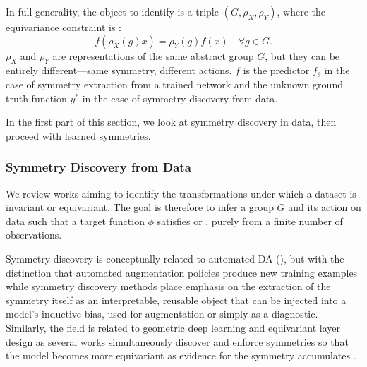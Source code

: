 \documentclass[mathematics,review,submit,moreauthors]{Definitions/mdpi}
\begin{document}
In full generality, the object to identify is a triple $(G, \rho_X, \rho_Y)$, where the equivariance constraint is :
\begin{equation}
    f(\rho_X(g) x) = \rho_Y(g) f(x) \quad \forall g \in G.
\end{equation}
$\rho_X$ and $\rho_Y$ are representations of the same abstract group $G$, but they can be entirely different---same symmetry, different actions.
$f$ is the predictor $f_\theta$ in the case of symmetry extraction from a trained network and the unknown ground truth function $y^*$ in the case of symmetry discovery from data.

In the first part of this section, we look at symmetry discovery in data, then proceed with learned symmetries.


\subsubsection{Symmetry Discovery from Data}\label{sec:sym-disc-from-data}


We review works aiming to identify the transformations under which a dataset is invariant or equivariant.
The goal is therefore to infer a group $G$ and its action on data such that a target function $\phi$ satisfies  or , purely from a finite number of observations.

Symmetry discovery is conceptually related to automated DA (), but with the distinction that automated augmentation policies produce new training examples while symmetry discovery methods place emphasis on the extraction of the symmetry itself as an interpretable, reusable object that can be injected into a model's inductive bias, used for augmentation or simply as a diagnostic.
Similarly, the field is related to geometric deep learning and equivariant layer design as several works simultaneously discover and enforce symmetries so that the model becomes more equivariant as evidence for the symmetry accumulates \citep{benton2020anips,ouderaa2022,otto2025,escriche2025}.
\end{document}
